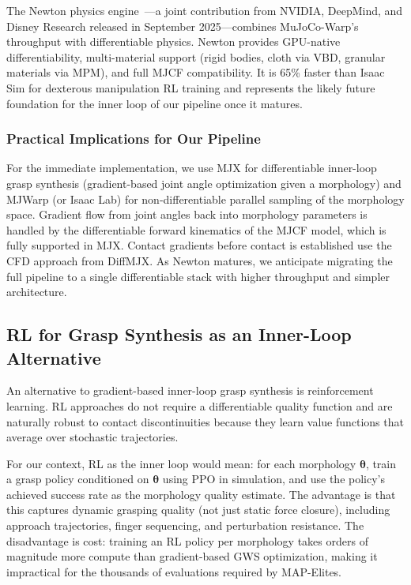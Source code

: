 \documentclass[journal]{IEEEtran}
\newcommand{\btheta}{\boldsymbol{\theta}}
\begin{document}
The Newton physics engine~\cite{newton2025}---a joint contribution from NVIDIA, DeepMind,
and Disney Research released in September 2025---combines MuJoCo-Warp's throughput with
differentiable physics.
Newton provides GPU-native differentiability, multi-material support (rigid bodies, cloth
via VBD, granular materials via MPM), and full MJCF compatibility.
It is 65\% faster than Isaac Sim for dexterous manipulation RL training and represents
the likely future foundation for the inner loop of our pipeline once it matures.

\subsubsection{Practical Implications for Our Pipeline}

For the immediate implementation, we use MJX for differentiable inner-loop grasp synthesis
(gradient-based joint angle optimization given a morphology) and MJWarp (or Isaac Lab) for
non-differentiable parallel sampling of the morphology space.
Gradient flow from joint angles back into morphology parameters is handled by the
differentiable forward kinematics of the MJCF model, which is fully supported in MJX.
Contact gradients before contact is established use the CFD approach from DiffMJX.
As Newton matures, we anticipate migrating the full pipeline to a single differentiable
stack with higher throughput and simpler architecture.

\subsection{RL for Grasp Synthesis as an Inner-Loop Alternative}
\label{sec:related_rl}

An alternative to gradient-based inner-loop grasp synthesis is reinforcement learning.
RL approaches do not require a differentiable quality function and are naturally robust to
contact discontinuities because they learn value functions that average over stochastic
trajectories.

For our context, RL as the inner loop would mean: for each morphology $\btheta$, train
a grasp policy conditioned on $\btheta$ using PPO in simulation, and use the policy's
achieved success rate as the morphology quality estimate.
The advantage is that this captures dynamic grasping quality (not just static force
closure), including approach trajectories, finger sequencing, and perturbation resistance.
The disadvantage is cost: training an RL policy per morphology takes orders of magnitude
more compute than gradient-based GWS optimization, making it impractical for the
thousands of evaluations required by MAP-Elites.
\end{document}
